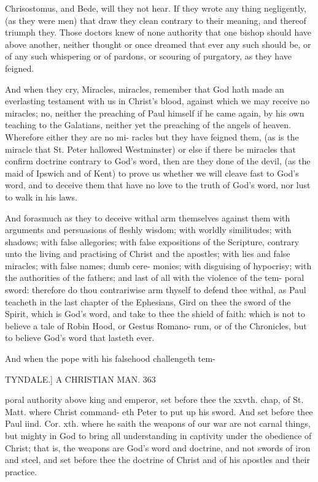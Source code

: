 \documentclass{custom}
\begin{document}
{Chrisostomus, and Bede, will they not hear. If they 
wrote any thing negligently, (as they were men) that draw 
they clean contrary to their meaning, and thereof triumph 
they. Those doctors knew of none authority that one 
bishop should have above another, neither thought or once 
dreamed that ever any such should be, or of any such 
whispering or of pardons, or scouring of purgatory, as 
they have feigned. 

And when they cry, Miracles, miracles, remember that 
God hath made an everlasting testament with us in Christ's 
blood, against which we may receive no miracles; no, neither 
the preaching of Paul himself if he came again, by his 
own teaching to the Galatians, neither yet the preaching of 
the angels of heaven. Wherefore either they are no mi- 
racles but they have feigned them, (as is the miracle that 
St. Peter hallowed Westminster) or else if there be miracles 
that confirm doctrine contrary to God's word, then are they 
done of the devil, (as the maid of Ipswich and of Kent) to 
prove us whether we will cleave fast to God's word, and 
to deceive them that have no love to the truth of God's 
word, nor lust to walk in his laws. 

And forasmuch as they to deceive withal arm themselves 
against them with arguments and persuasions of fleshly 
wisdom; with worldly similitudes; with shadows; with false 
allegories; with false expositions of the Scripture, contrary 
unto the living and practising of Christ and the apostles; 
with lies and false miracles; with false names; dumb cere- 
monies; with disguising of hypocrisy; with the authorities 
of the fathers; and last of all with the violence of the tem- 
poral sword: therefore do thou contrariwise arm thyself to 
defend thee withal, as Paul teacheth in the last chapter of 
the Ephesians, Gird on thee the sword of the Spirit, which 
is God's word, and take to thee the shield of faith: which is 
not to believe a tale of Robin Hood, or Gestus Romano- 
rum, or of the Chronicles, but to believe God's word that 
lasteth ever. 

And when the pope with his falsehood challengeth tem- 


TYNDALE.] A CHRISTIAN MAN. 363

poral authority above king and emperor, set before thee 
the xxvth. chap, of St. Matt. where Christ command- 
eth Peter to put up his sword. And set before thee 
Paul iind. Cor. xth. where he saith the weapons of our 
war are not carnal things, but mighty in God to bring all 
understanding in captivity under the obedience of Christ; 
that is, the weapons are God's word and doctrine, and not 
swords of iron and steel, and set before thee the doctrine 
of Christ and of his apostles and their practice. 

}
\end{document}

